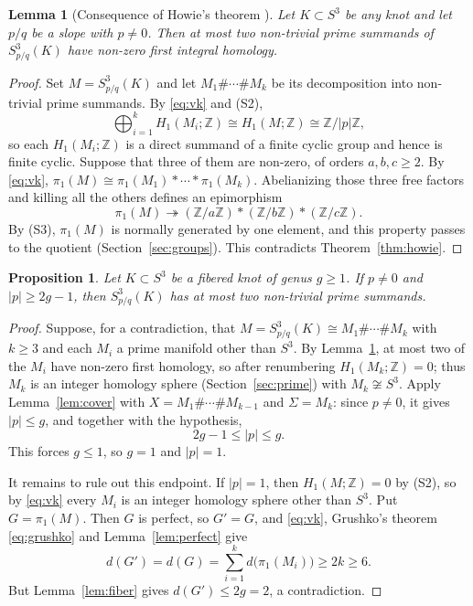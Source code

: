 \documentclass[11pt]{article}
\newcommand{\Z}{\mathbb Z}
\newcommand{\Surg}[2]{S^3_{#1}(#2)}
\newcommand{\rk}{d}
\newtheorem{lemma}[theorem]{Lemma}
\newtheorem{proposition}[theorem]{Proposition}
\theoremstyle{definition}
\theoremstyle{remark}
\begin{document}
\begin{lemma}[Consequence of Howie's theorem {\cite{Howie2002}}]\label{lem:howie}
Let \(K\subset S^3\) be any knot and let \(p/q\) be a slope with
\(p\neq0\). Then at most two non-trivial prime summands of
\(\Surg{p/q}{K}\) have non-zero first integral homology.
\end{lemma}

\begin{proof}
Set \(M=\Surg{p/q}{K}\) and let \(M_1\#\cdots\#M_k\) be its decomposition
into non-trivial prime summands. By \eqref{eq:vk} and (S2),
\[
 \bigoplus_{i=1}^k H_1(M_i;\Z)\cong H_1(M;\Z)\cong\Z/|p|\Z,
\]
so each \(H_1(M_i;\Z)\) is a direct summand of a finite cyclic group and
hence is finite cyclic. Suppose that three of them are non-zero, of
orders \(a,b,c\geq2\). By \eqref{eq:vk},
\(\pi_1(M)\cong\pi_1(M_1)*\cdots*\pi_1(M_k)\). Abelianizing those three
free factors and killing all the others defines an epimorphism
\[
 \pi_1(M)\twoheadrightarrow(\Z/a\Z)*(\Z/b\Z)*(\Z/c\Z).
\]
By (S3), \(\pi_1(M)\) is normally generated by one element, and this
property passes to the quotient (Section~\ref{sec:groups}). This
contradicts Theorem~\ref{thm:howie}.
\end{proof}

\begin{proposition}\label{prop:large}
Let \(K\subset S^3\) be a fibered knot of genus \(g\geq1\). If
\(p\neq0\) and \(|p|\geq2g-1\), then \(\Surg{p/q}{K}\) has at most two
non-trivial prime summands.
\end{proposition}

\begin{proof}
Suppose, for a contradiction, that \(M=\Surg{p/q}{K}\cong M_1\#\cdots\#M_k\)
with \(k\geq3\) and each \(M_i\) a prime manifold other than \(S^3\). By
Lemma~\ref{lem:howie}, at most two of the \(M_i\) have non-zero first
homology, so after renumbering \(H_1(M_k;\Z)=0\); thus \(M_k\) is an
integer homology sphere (Section~\ref{sec:prime}) with
\(M_k\not\cong S^3\). Apply Lemma~\ref{lem:cover} with
\(X=M_1\#\cdots\#M_{k-1}\) and \(\Sigma=M_k\): since \(p\neq0\), it gives
\(|p|\leq g\), and together with the hypothesis,
\[
 2g-1\leq|p|\leq g .
\]
This forces \(g\leq1\), so \(g=1\) and \(|p|=1\).

It remains to rule out this endpoint. If \(|p|=1\), then
\(H_1(M;\Z)=0\) by (S2), so by \eqref{eq:vk} every \(M_i\) is an integer
homology sphere other than \(S^3\). Put \(G=\pi_1(M)\). Then \(G\) is
perfect, so \(G'=G\), and \eqref{eq:vk}, Grushko's theorem
\eqref{eq:grushko} and Lemma~\ref{lem:perfect} give
\[
 \rk(G')=\rk(G)=\sum_{i=1}^k\rk\bigl(\pi_1(M_i)\bigr)\geq2k\geq6.
\]
But Lemma~\ref{lem:fiber} gives \(\rk(G')\leq2g=2\), a contradiction.
\end{proof}
\end{document}
